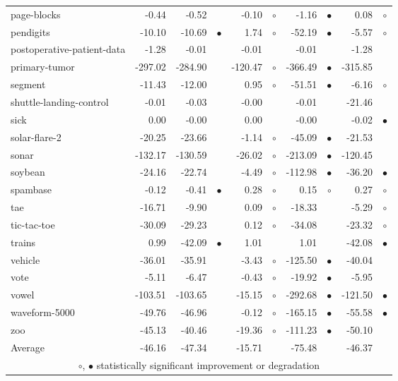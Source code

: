 {\begin{longtable}{lrr@{\hspace{0.1cm}}cr@{\hspace{0.1cm}}cr@{\hspace{0.1cm}}cr@{\hspace{0.1cm}}c}
page-blocks &   -0.44 &   -0.52 &           &   -0.10 &  $\circ$ &   -1.16 & $\bullet$ &    0.08 &   $\circ$\\
pendigits &  -10.10 &  -10.69 & $\bullet$ &    1.74 &  $\circ$ &  -52.19 & $\bullet$ &   -5.57 &   $\circ$\\
postoperative-patient-data &   -1.28 &   -0.01 &           &   -0.01 &          &   -0.01 &           &   -1.28 &          \\
primary-tumor & -297.02 & -284.90 &           & -120.47 &  $\circ$ & -366.49 & $\bullet$ & -315.85 &          \\
segment &  -11.43 &  -12.00 &           &    0.95 &  $\circ$ &  -51.51 & $\bullet$ &   -6.16 &   $\circ$\\
shuttle-landing-control &   -0.01 &   -0.03 &           &   -0.00 &          &   -0.01 &           &  -21.46 &          \\
sick &    0.00 &   -0.00 &           &    0.00 &          &   -0.00 &           &   -0.02 & $\bullet$\\
solar-flare-2 &  -20.25 &  -23.66 &           &   -1.14 &  $\circ$ &  -45.09 & $\bullet$ &  -21.53 &          \\
sonar & -132.17 & -130.59 &           &  -26.02 &  $\circ$ & -213.09 & $\bullet$ & -120.45 &          \\
soybean &  -24.16 &  -22.74 &           &   -4.49 &  $\circ$ & -112.98 & $\bullet$ &  -36.20 & $\bullet$\\
spambase &   -0.12 &   -0.41 & $\bullet$ &    0.28 &  $\circ$ &    0.15 &   $\circ$ &    0.27 &   $\circ$\\
tae &  -16.71 &   -9.90 &           &    0.09 &  $\circ$ &  -18.33 &           &   -5.29 &   $\circ$\\
tic-tac-toe &  -30.09 &  -29.23 &           &    0.12 &  $\circ$ &  -34.08 &           &  -23.32 &   $\circ$\\
trains &    0.99 &  -42.09 & $\bullet$ &    1.01 &          &    1.01 &           &  -42.08 & $\bullet$\\
vehicle &  -36.01 &  -35.91 &           &   -3.43 &  $\circ$ & -125.50 & $\bullet$ &  -40.04 &          \\
vote &   -5.11 &   -6.47 &           &   -0.43 &  $\circ$ &  -19.92 & $\bullet$ &   -5.95 &          \\
vowel & -103.51 & -103.65 &           &  -15.15 &  $\circ$ & -292.68 & $\bullet$ & -121.50 & $\bullet$\\
waveform-5000 &  -49.76 &  -46.96 &           &   -0.12 &  $\circ$ & -165.15 & $\bullet$ &  -55.58 & $\bullet$\\
zoo &  -45.13 &  -40.46 &           &  -19.36 &  $\circ$ & -111.23 & $\bullet$ &  -50.10 &          \\
\hline
Average &  -46.16 &  -47.34 &           &  -15.71 &          &  -75.48 &           &  -46.37 &          \\
\hline
\multicolumn{10}{c}{$\circ$, $\bullet$ statistically significant improvement or degradation}\\
\end{longtable} \footnotesize \par}
